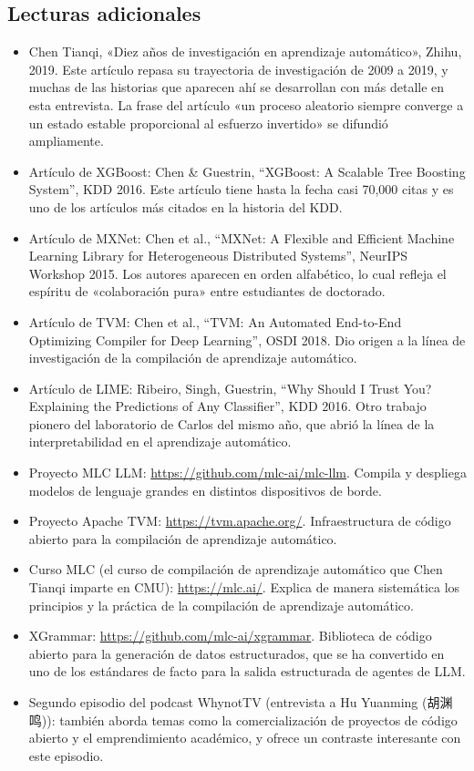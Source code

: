 \documentclass[a4paper]{article}
\begin{document}
\subsection{Lecturas adicionales}

\begin{itemize}
    \item Chen Tianqi, «Diez años de investigación en aprendizaje automático», Zhihu, 2019. Este artículo repasa su trayectoria de investigación de 2009 a 2019, y muchas de las historias que aparecen ahí se desarrollan con más detalle en esta entrevista. La frase del artículo «un proceso aleatorio siempre converge a un estado estable proporcional al esfuerzo invertido» se difundió ampliamente.
    \item Artículo de XGBoost: Chen \& Guestrin, ``XGBoost: A Scalable Tree Boosting System'', KDD 2016. Este artículo tiene hasta la fecha casi 70,000 citas y es uno de los artículos más citados en la historia del KDD.
    \item Artículo de MXNet: Chen et al., ``MXNet: A Flexible and Efficient Machine Learning Library for Heterogeneous Distributed Systems'', NeurIPS Workshop 2015. Los autores aparecen en orden alfabético, lo cual refleja el espíritu de «colaboración pura» entre estudiantes de doctorado.
    \item Artículo de TVM: Chen et al., ``TVM: An Automated End-to-End Optimizing Compiler for Deep Learning'', OSDI 2018. Dio origen a la línea de investigación de la compilación de aprendizaje automático.
    \item Artículo de LIME: Ribeiro, Singh, Guestrin, ``Why Should I Trust You? Explaining the Predictions of Any Classifier'', KDD 2016. Otro trabajo pionero del laboratorio de Carlos del mismo año, que abrió la línea de la interpretabilidad en el aprendizaje automático.
    \item Proyecto MLC LLM: \url{https://github.com/mlc-ai/mlc-llm}. Compila y despliega modelos de lenguaje grandes en distintos dispositivos de borde.
    \item Proyecto Apache TVM: \url{https://tvm.apache.org/}. Infraestructura de código abierto para la compilación de aprendizaje automático.
    \item Curso MLC (el curso de compilación de aprendizaje automático que Chen Tianqi imparte en CMU): \url{https://mlc.ai/}. Explica de manera sistemática los principios y la práctica de la compilación de aprendizaje automático.
    \item XGrammar: \url{https://github.com/mlc-ai/xgrammar}. Biblioteca de código abierto para la generación de datos estructurados, que se ha convertido en uno de los estándares de facto para la salida estructurada de agentes de LLM.
    \item Segundo episodio del podcast WhynotTV (entrevista a Hu Yuanming (胡渊鸣)): también aborda temas como la comercialización de proyectos de código abierto y el emprendimiento académico, y ofrece un contraste interesante con este episodio.
\end{itemize}
\end{document}
